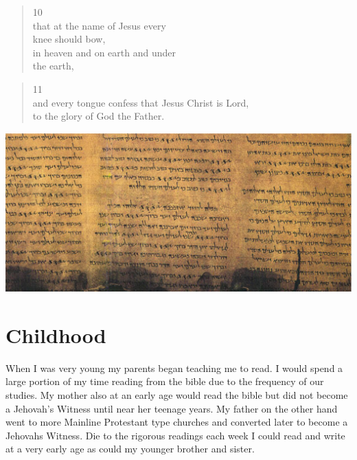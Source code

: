 \documentclass[11pt,a4paper]{scrartcl} %
\begin{document}
\begin{verse}
10\\ that at the name of Jesus every\\ knee should bow,\\ in heaven and on earth and under\\ the earth,
\end{verse}
\begin{verse}
11\\ and every tongue confess that Jesus Christ is Lord,\\ to the glory of God the Father.
\end{verse} 
\includegraphics[scale=1]{deadsea}
\clearpage
\title{\textcolor{Maroon}{\rmfamily\normalfont{}}}
    \author{\textcolor{brown}{}}
    \date{} %
    
    \maketitle
    
    \begin{abstract}
  
    \end{abstract}
       
    \tableofcontents
    
    \section{Childhood}
When I was very young my parents began teaching me to read. I would spend a large portion of my time reading from the bible due to the frequency of our studies. My mother also at an early age would read the bible but did not become a Jehovah's Witness until near her teenage years. My father on the other hand went to more Mainline Protestant type churches and converted later to become a Jehovahs Witness. Die to the rigorous readings each week I could read and write at a very early age as could my younger brother and sister. 

    \nocite{*}
    
    
\end{document}
